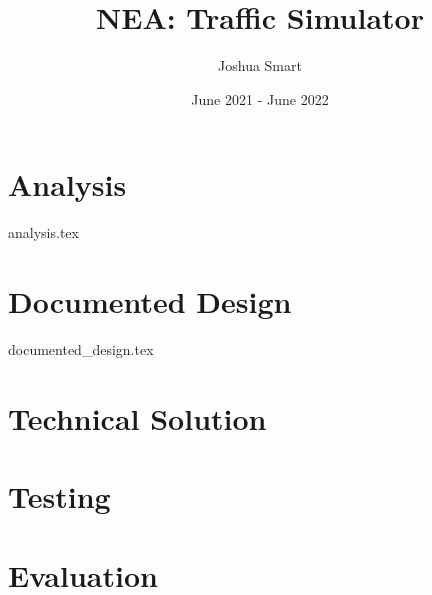 \documentclass{report}
\title{NEA: Traffic Simulator}
\author{Joshua Smart}
\date{June 2021 - June 2022}
\begin{document}
    \begin{titlepage}
        \maketitle
    \end{titlepage}

    \tableofcontents

    \setparagraphstyling
    \chapter{Analysis}
        {analysis.tex}

    \chapter{Documented Design}
        {documented_design.tex}

    \chapter{Technical Solution}

    \chapter{Testing}

    \chapter{Evaluation}

    \printbibliography
\end{document}
